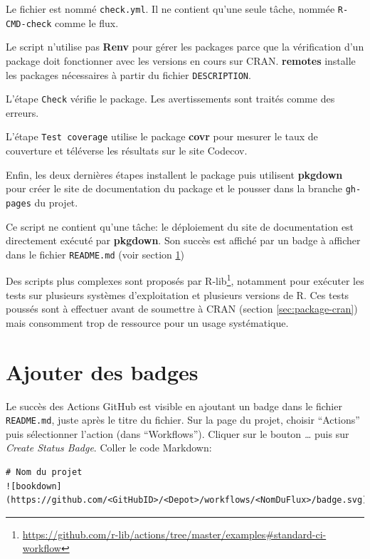 \documentclass[
  12pt,
  french,
  a4paper,
  extrafontsizes,onecolumn,openright
  ]{memoir}
\begin{document}
Le fichier est nommé \texttt{check.yml}.
Il ne contient qu'une seule tâche, nommée \texttt{R-CMD-check} comme le flux.

Le script n'utilise pas \textbf{Renv} pour gérer les packages parce que la vérification d'un package doit fonctionner avec les versions en cours sur CRAN.
\textbf{remotes} installe les packages nécessaires à partir du fichier \texttt{DESCRIPTION}.

L'étape \texttt{Check} vérifie le package.
Les avertissements sont traités comme des erreurs.

L'étape \texttt{Test\ coverage} utilise le package \textbf{covr} pour mesurer le taux de couverture et téléverse les résultats sur le site Codecov.

Enfin, les deux dernières étapes installent le package puis utilisent \textbf{pkgdown} pour créer le site de documentation du package et le pousser dans la branche \texttt{gh-pages} du projet.

Ce script ne contient qu'une tâche: le déploiement du site de documentation est directement exécuté par \textbf{pkgdown}.
Son succès est affiché par un badge à afficher dans le fichier \texttt{README.md} (voir section \ref{sec:ci-badges})

Des scripts plus complexes sont proposés par R-lib\footnote{\url{https://github.com/r-lib/actions/tree/master/examples\#standard-ci-workflow}}, notamment pour exécuter les tests sur plusieurs systèmes d'exploitation et plusieurs versions de R.
Ces tests poussés sont à effectuer avant de soumettre à CRAN (section \ref{sec:package-cran}) mais consomment trop de ressource pour un usage systématique.

\hypertarget{sec:ci-badges}{%
\section{Ajouter des badges}\label{sec:ci-badges}}

Le succès des Actions GitHub est visible en ajoutant un badge dans le fichier \texttt{README.md}, juste après le titre du fichier.
Sur la page du projet, choisir \enquote{Actions} puis sélectionner l'action (dans \enquote{Workflows}).
Cliquer sur le bouton \emph{\ldots{}} puis sur \emph{Create Status Badge}.
Coller le code Markdown:

\begin{verbatim}
# Nom du projet
![bookdown](https://github.com/<GitHubID>/<Depot>/workflows/<NomDuFlux>/badge.svg)
\end{verbatim}
\end{document}
